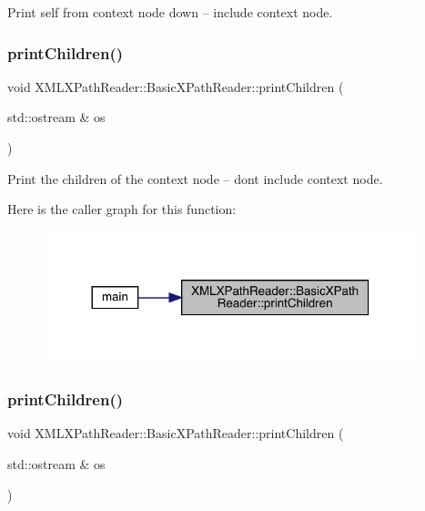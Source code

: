 Print self from context node down -- include context node. 

\mbox{\label{classXMLXPathReader_1_1BasicXPathReader_a980f4e08d97855479d47e5b10205075e}} 
\subsubsection{\texorpdfstring{printChildren()}{printChildren()}\hspace{0.1cm}{\footnotesize\ttfamily [1/3]}}
{\footnotesize\ttfamily void X\+M\+L\+X\+Path\+Reader\+::\+Basic\+X\+Path\+Reader\+::print\+Children (\begin{DoxyParamCaption}\item[{std\+::ostream \&}]{os }\end{DoxyParamCaption})}



Print the children of the context node -- dont include context node. 

Here is the caller graph for this function\+:
\nopagebreak
\begin{figure}[H]
\begin{center}
\leavevmode
\includegraphics[width=308pt]{d6/dbf/classXMLXPathReader_1_1BasicXPathReader_a980f4e08d97855479d47e5b10205075e_icgraph}
\end{center}
\end{figure}
\mbox{\label{classXMLXPathReader_1_1BasicXPathReader_a980f4e08d97855479d47e5b10205075e}} 
\subsubsection{\texorpdfstring{printChildren()}{printChildren()}\hspace{0.1cm}{\footnotesize\ttfamily [2/3]}}
{\footnotesize\ttfamily void X\+M\+L\+X\+Path\+Reader\+::\+Basic\+X\+Path\+Reader\+::print\+Children (\begin{DoxyParamCaption}\item[{std\+::ostream \&}]{os }\end{DoxyParamCaption})}



